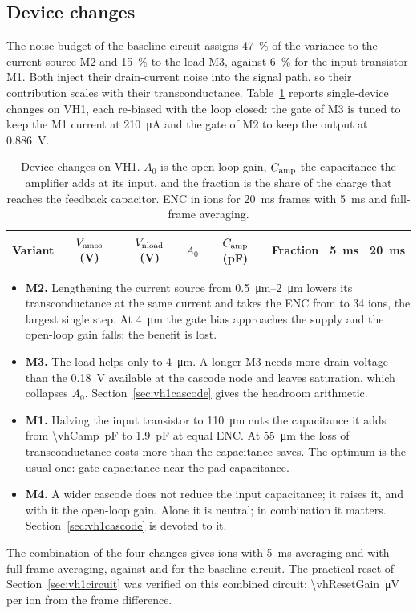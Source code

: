 \documentclass[11pt,a4paper]{article}
\begin{document}
\subsection{Device changes}
\label{sec:vh1devices}
%
The noise budget of the baseline circuit assigns \SI{47}{\percent} of the
variance to the current source M2 and \SI{15}{\percent} to the load M3,
against \SI{6}{\percent} for the input transistor M1. Both inject their
drain-current noise into the signal path, so their contribution scales with
their transconductance. Table~\ref{tab:vh1sweeps} reports single-device
changes on VH1, each re-biased with the loop closed: the gate of M3 is
tuned to keep the M1 current at \SI{210}{\micro A} and the gate of M2 to
keep the output at \SI{0.886}{V}.
%
\begin{table}[htbp]\centering
\caption{Device changes on VH1. $A_0$ is the open-loop gain, $C_{\rm amp}$
the capacitance the amplifier adds at its input, and the fraction is the
share of the charge that reaches the feedback capacitor. ENC in ions for
\SI{20}{ms} frames with \SI{5}{ms} and full-frame averaging.}
\footnotesize
\begin{tabular}{lcccccrr}
\toprule
Variant & $V_{\rm nmos}$ (V) & $V_{\rm nload}$ (V) & $A_0$ & $C_{\rm amp}$ (pF) & Fraction & \SI{5}{ms} & \SI{20}{ms}\\
\midrule

\end{tabular}
\label{tab:vh1sweeps}
\end{table}
%
\begin{itemize}
\item \textbf{M2.} Lengthening the current source from \SIrange{0.5}{2}{\um}
  lowers its transconductance at the same current and takes the ENC from
  \vhEncBaseFive{} to 34 ions, the largest single step. At \SI{4}{\um} the
  gate bias approaches the supply and the open-loop gain falls; the benefit
  is lost.
\item \textbf{M3.} The load helps only to \SI{4}{\um}. A longer M3 needs
  more drain voltage than the \SI{0.18}{V} available at the cascode node
  and leaves saturation, which collapses $A_0$. Section~\ref{sec:vh1cascode}
  gives the headroom arithmetic.
\item \textbf{M1.} Halving the input transistor to \SI{110}{\um} cuts the
  capacitance it adds from \SI{\vhCamp}{pF} to \SI{1.9}{pF} at equal ENC.
  At \SI{55}{\um} the loss of transconductance costs more than the
  capacitance saves. The optimum is the usual one: gate capacitance near
  the pad capacitance.
\item \textbf{M4.} A wider cascode does not reduce the input capacitance;
  it raises it, and with it the open-loop gain. Alone it is neutral; in
  combination it matters. Section~\ref{sec:vh1cascode} is devoted to it.
\end{itemize}
%
The combination of the four changes gives \vhEncImpFive{} ions with
\SI{5}{ms} averaging and \vhEncImpFull{} with full-frame averaging, against
\vhEncPresFive{} and \vhEncPresFull{} for the baseline circuit. The
practical reset of Section~\ref{sec:vh1circuit} was verified on this
combined circuit: \SI{\vhResetGain}{\micro V} per ion from the frame
difference.
\end{document}

